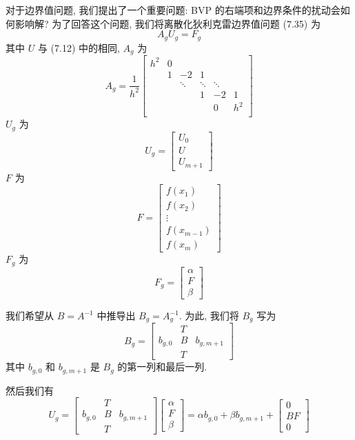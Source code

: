 \documentclass[a4paper]{ctexart}
\begin{document}
对于边界值问题, 我们提出了一个重要问题: BVP 的右端项和边界条件的扰动会如何影响解? 
为了回答这个问题, 我们将离散化狄利克雷边界值问题 (7.35) 为
$$
A_g U_g = F_g
$$
其中 $U$ 与 (7.12) 中的相同, $A_g$ 为
$$
A_g = \frac{1}{h^2} \begin{bmatrix}
h^2 & 0 &   &  & & \\
&1 & -2 & 1 & &  \\
  &  &\ddots & \ddots & \ddots & \\
 &&  & 1 & -2 & 1 \\
 &&  &   &  0  & h^2 \\
\end{bmatrix}
$$
$U_g$ 为
$$
U_g = \begin{bmatrix}
U_0 \\
U \\
U_{m+1}
\end{bmatrix}
$$
$F$ 为
$$
F = \begin{bmatrix}
f(x_1) \\
f(x_2) \\
\vdots \\
f(x_{m-1}) \\
f(x_m)
\end{bmatrix}
$$
$F_g$ 为
$$
F_g = \begin{bmatrix}
\alpha \\
F \\
\beta
\end{bmatrix}
$$

我们希望从 \(B = A^{-1}\) 中推导出 \(B_g = A_g^{-1}\). 为此, 我们将 \(B_g\) 写为
$$
B_g = 
\begin{bmatrix}
 & T \\
b_{g,0} & B & b_{g,m+1} \\
 & T
\end{bmatrix}
$$
其中 \(b_{g,0}\) 和 \(b_{g,m+1}\) 是 \(B_g\) 的第一列和最后一列.

然后我们有
$$ U_g = 
\begin{bmatrix}
 & T \\
b_{g,0} & B & b_{g,m+1} \\
 & T
\end{bmatrix}
\begin{bmatrix}
\alpha \\
F \\
\beta
\end{bmatrix}
= \alpha b_{g,0} + \beta b_{g,m+1} + \begin{bmatrix}
0 \\
BF \\
0
\end{bmatrix}
$$
\end{document}
